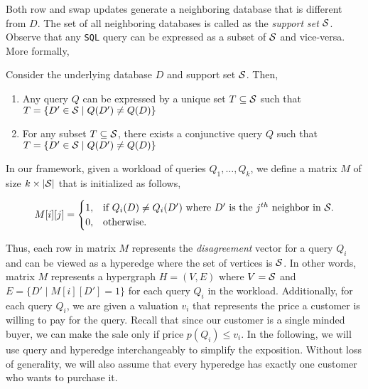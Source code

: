 Both row and swap updates generate a neighboring database that is different from $D$. The set of all neighboring databases is called as the \emph{support set} $\mathcal{S}$. Observe that any \texttt{SQL} query can be expressed as a subset of $\mathcal{S}$ and vice-versa. More formally,

\begin{proposition}
	Consider the underlying database $D$ and support set $\mathcal{S}$. Then,
	\begin{enumerate}
		\item Any query $Q$ can be expressed by a unique set $T \subseteq \mathcal{S}$ such that $T = \{ D' \in \mathcal{S} \mid Q(D') \neq Q(D)\}$
		\item For any subset $T \subseteq \mathcal{S}$, there exists a conjunctive query $Q$ such that $T = \{ D' \in \mathcal{S} \mid Q(D') \neq Q(D)\}$
	\end{enumerate} 
\end{proposition}	

In our framework, given a workload of queries $Q_1, \dots, Q_k$, we define a matrix $M$ of size $k \times |\mathcal{S}|$ that is initialized as follows, 

\begin{equation}
M[i][j]=\begin{cases}
1, & \text{if $Q_i(D) \neq Q_i(D')$ where $D'$ is the $j^{th}$ neighbor in $\mathcal{S}$}.\\
0, & \text{otherwise}.
\end{cases}
\end{equation}

Thus, each row in matrix $M$ represents the \emph{disagreement} vector for a query $Q_i$ and can be viewed as a hyperedge where the set of vertices is $\mathcal{S}$. In other words, matrix $M$ represents a hypergraph $H = (V, E)$ where $V = \mathcal{S}$ and $E = \{ D' \mid M[i][D'] = 1\}$ for each query $Q_i$ in the workload. Additionally, for each query $Q_i$, we are given a valuation $v_i$ that represents the price a customer is willing to pay for the query. Recall that since our customer is a single minded buyer, we can make the sale only if price $p(Q_i) \leq v_i$. In the following, we will use query and hyperedge interchangeably to simplify the exposition. Without loss of generality, we will also assume that every hyperedge has exactly one customer who wants to purchase it. 




